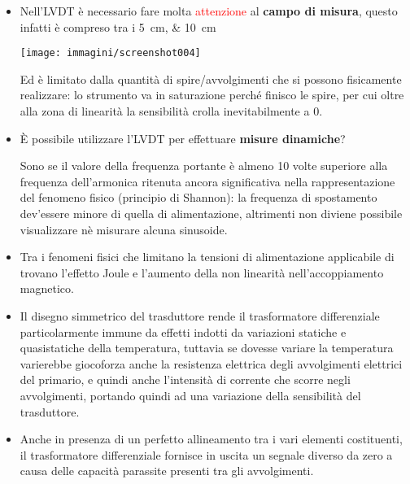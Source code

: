 \documentclass[a4paper, 15pt]{article}
\newcommand{\xmark}{\ding{55}}
\begin{document}
\begin{adjustwidth}{2in}{}
	\begin{itemize}[label={\textcolor{red}{\xmark}}]
	\item Nell'LVDT è necessario fare molta \textcolor{red}{attenzione} al \textbf{campo di misura}, questo infatti è compreso tra i \qtylist{5;10}{\centi\metre}
	\begin{center}
		\texttt{[image: immagini/screenshot004]}
	\end{center}
	Ed è limitato dalla quantità di spire/avvolgimenti che si possono fisicamente realizzare: lo strumento va in saturazione perché finisco le spire, per cui oltre alla zona di linearità la sensibilità crolla inevitabilmente a 0.  
	
	\item È possibile utilizzare l'LVDT per effettuare \textbf{misure dinamiche}?
	
	Sono se il valore della frequenza portante è almeno 10 volte superiore alla frequenza dell'armonica ritenuta ancora significativa nella rappresentazione del fenomeno fisico (principio di Shannon): la frequenza di spostamento dev'essere minore di quella di alimentazione, altrimenti non diviene possibile visualizzare nè misurare alcuna sinusoide.  
	
	\item Tra i fenomeni fisici che limitano la tensioni di alimentazione applicabile di trovano l'effetto Joule e l'aumento della non linearità nell'accoppiamento magnetico.
	
	\item Il disegno simmetrico del trasduttore rende il trasformatore differenziale
	particolarmente immune da effetti indotti da variazioni statiche e quasistatiche
	della temperatura, tuttavia se dovesse variare la temperatura varierebbe giocoforza anche la resistenza elettrica degli avvolgimenti elettrici del primario, e quindi anche l'intensità di corrente che scorre negli avvolgimenti, portando quindi ad una variazione della sensibilità del trasduttore.  
	
	\item Anche in presenza di un perfetto allineamento tra i vari elementi costituenti, il
	trasformatore differenziale fornisce in uscita un segnale diverso da zero a
	causa delle capacità parassite presenti tra gli avvolgimenti.
	\end{itemize}
\end{adjustwidth}
\end{document}
